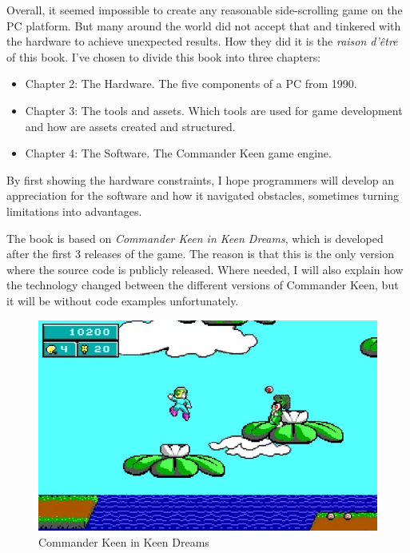 \documentclass[book.tex]{subfiles}
\begin{document}
Overall, it seemed impossible to create any reasonable side-scrolling game on the PC platform. But many around the world did not accept that and tinkered with the hardware to achieve unexpected results. How they did it is the \textit{raison d'\^etre} of this book. I've chosen to divide this book into three chapters:
\begin{itemize}
  \item Chapter 2: The Hardware. The five components of a PC from 1990.
  \item Chapter 3: The tools and assets. Which tools are used for game development and how are assets created and structured.
  \item Chapter 4: The Software. The Commander Keen game engine.
\end{itemize}
By first showing the hardware constraints, I hope programmers will develop an appreciation for the software and how it navigated obstacles, sometimes turning limitations into advantages.\\
\par
The book is based on \textit{Commander Keen in Keen Dreams}, which is developed after the first 3 releases of the game. The reason is that this is the only version where the source code is publicly released. Where needed, I will also explain how the technology changed between the different versions of Commander Keen, but it will be without code examples unfortunately.\\
\begin{figure}[H]
  \centering
 \includegraphics[width=1.0\textwidth]{screenshots_300dpi/Keen_Dreams.png}
\caption{Commander Keen in Keen Dreams}
\end{figure}
\par
\end{document}

